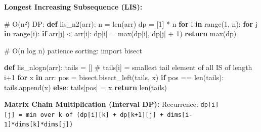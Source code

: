 \documentclass[11pt]{article}
\newenvironment{Shaded}{\begin{snugshade}}{\end{snugshade}}
\newcommand{\BuiltInTok}[1]{\textcolor[rgb]{0.50,0.55,0.55}{#1}}
\newcommand{\CommentTok}[1]{\textcolor[rgb]{0.48,0.49,0.49}{#1}}
\newcommand{\ControlFlowTok}[1]{\textcolor[rgb]{0.99,0.74,0.29}{\textbf{#1}}}
\newcommand{\DecValTok}[1]{\textcolor[rgb]{0.96,0.45,0.00}{#1}}
\newcommand{\ImportTok}[1]{\textcolor[rgb]{0.15,0.68,0.38}{#1}}
\newcommand{\KeywordTok}[1]{\textcolor[rgb]{0.81,0.81,0.76}{\textbf{#1}}}
\newcommand{\NormalTok}[1]{\textcolor[rgb]{0.81,0.81,0.76}{#1}}
\newcommand{\OperatorTok}[1]{\textcolor[rgb]{0.81,0.81,0.76}{#1}}
\begin{document}
\textbf{Longest Increasing Subsequence (LIS):}


\begin{Shaded}
\begin{Highlighting}[]
\CommentTok{\# O(n²) DP:}
\KeywordTok{def}\NormalTok{ lis\_n2(arr):}
\NormalTok{    n }\OperatorTok{=} \BuiltInTok{len}\NormalTok{(arr)}
\NormalTok{    dp }\OperatorTok{=}\NormalTok{ [}\DecValTok{1}\NormalTok{] }\OperatorTok{*}\NormalTok{ n}
    \ControlFlowTok{for}\NormalTok{ i }\KeywordTok{in} \BuiltInTok{range}\NormalTok{(}\DecValTok{1}\NormalTok{, n):}
        \ControlFlowTok{for}\NormalTok{ j }\KeywordTok{in} \BuiltInTok{range}\NormalTok{(i):}
            \ControlFlowTok{if}\NormalTok{ arr[j] }\OperatorTok{\textless{}}\NormalTok{ arr[i]:}
\NormalTok{                dp[i] }\OperatorTok{=} \BuiltInTok{max}\NormalTok{(dp[i], dp[j] }\OperatorTok{+} \DecValTok{1}\NormalTok{)}
    \ControlFlowTok{return} \BuiltInTok{max}\NormalTok{(dp)}

\CommentTok{\# O(n log n) patience sorting:}
\ImportTok{import}\NormalTok{ bisect}

\KeywordTok{def}\NormalTok{ lis\_nlogn(arr):}
\NormalTok{    tails }\OperatorTok{=}\NormalTok{ []  }\CommentTok{\# tails[i] = smallest tail element of all IS of length i+1}
    \ControlFlowTok{for}\NormalTok{ x }\KeywordTok{in}\NormalTok{ arr:}
\NormalTok{        pos }\OperatorTok{=}\NormalTok{ bisect.bisect\_left(tails, x)}
        \ControlFlowTok{if}\NormalTok{ pos }\OperatorTok{==} \BuiltInTok{len}\NormalTok{(tails):}
\NormalTok{            tails.append(x)}
        \ControlFlowTok{else}\NormalTok{:}
\NormalTok{            tails[pos] }\OperatorTok{=}\NormalTok{ x}
    \ControlFlowTok{return} \BuiltInTok{len}\NormalTok{(tails)}
\end{Highlighting}
\end{Shaded}

\textbf{Matrix Chain Multiplication (Interval DP):}
Recurrence: \texttt{dp{[}i{]}{[}j{]}\ =\ min\ over\ k\ of\ (dp{[}i{]}{[}k{]}\ +\ dp{[}k+1{]}{[}j{]}\ +\ dims{[}i-1{]}*dims{[}k{]}*dims{[}j{]})}

\end{document}
